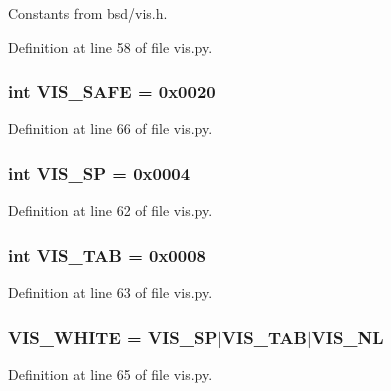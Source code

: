 Constants from bsd/vis.\+h. 



Definition at line 58 of file vis.\+py.

\subsubsection[{V\+I\+S\+\_\+\+S\+A\+F\+E}]{\setlength{\rightskip}{0pt plus 5cm}int V\+I\+S\+\_\+\+S\+A\+F\+E = 0x0020}\label{namespacevis_a5643147e3f575749e54c01cca3517c3b}


Definition at line 66 of file vis.\+py.

\subsubsection[{V\+I\+S\+\_\+\+S\+P}]{\setlength{\rightskip}{0pt plus 5cm}int V\+I\+S\+\_\+\+S\+P = 0x0004}\label{namespacevis_afb48fd3b04b5990dcb3a744ebbd8d5d7}


Definition at line 62 of file vis.\+py.

\subsubsection[{V\+I\+S\+\_\+\+T\+A\+B}]{\setlength{\rightskip}{0pt plus 5cm}int V\+I\+S\+\_\+\+T\+A\+B = 0x0008}\label{namespacevis_af1b7a925ee29f7869d7c02f5fee9bfa0}


Definition at line 63 of file vis.\+py.

\subsubsection[{V\+I\+S\+\_\+\+W\+H\+I\+T\+E}]{\setlength{\rightskip}{0pt plus 5cm}V\+I\+S\+\_\+\+W\+H\+I\+T\+E = {\bf V\+I\+S\+\_\+\+S\+P}$\vert${\bf V\+I\+S\+\_\+\+T\+A\+B}$\vert${\bf V\+I\+S\+\_\+\+N\+L}}\label{namespacevis_a18ed068eaf7072d4d24873547c907f67}


Definition at line 65 of file vis.\+py.

